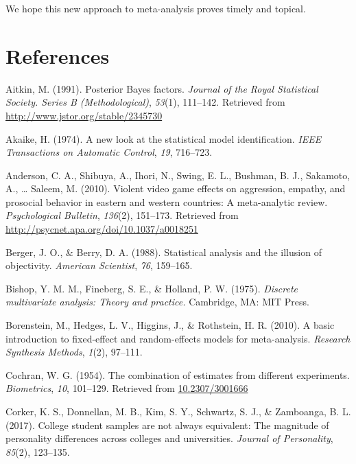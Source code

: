\documentclass[english,man]{apa6}
\theoremstyle{definition}
\theoremstyle{definition}
\theoremstyle{remark}
\begin{document}
We hope this new approach to meta-analysis proves timely and topical.

\newpage

\section*{References}\label{references}

\hypertarget{refs}{}
\hypertarget{ref-Aitkin:1991}{}
Aitkin, M. (1991). Posterior Bayes factors. \emph{Journal of the Royal
Statistical Society. Series B (Methodological)}, \emph{53}(1), 111--142.
Retrieved from \url{http://www.jstor.org/stable/2345730}

\hypertarget{ref-Akaike:1974}{}
Akaike, H. (1974). A new look at the statistical model identification.
\emph{IEEE Transactions on Automatic Control}, \emph{19}, 716--723.

\hypertarget{ref-Anderson:etal:2010}{}
Anderson, C. A., Shibuya, A., Ihori, N., Swing, E. L., Bushman, B. J.,
Sakamoto, A., \ldots{} Saleem, M. (2010). Violent video game effects on
aggression, empathy, and prosocial behavior in eastern and western
countries: A meta-analytic review. \emph{Psychological Bulletin},
\emph{136}(2), 151--173. Retrieved from
\url{http://psycnet.apa.org/doi/10.1037/a0018251}

\hypertarget{ref-Berger:Berry:1988}{}
Berger, J. O., \& Berry, D. A. (1988). Statistical analysis and the
illusion of objectivity. \emph{American Scientist}, \emph{76}, 159--165.

\hypertarget{ref-Bishop:etal:1975}{}
Bishop, Y. M. M., Fineberg, S. E., \& Holland, P. W. (1975).
\emph{Discrete multivariate analysis: Theory and practice.} Cambridge,
MA: MIT Press.

\hypertarget{ref-Borenstein:etal:2010}{}
Borenstein, M., Hedges, L. V., Higgins, J., \& Rothstein, H. R. (2010).
A basic introduction to fixed-effect and random-effects models for
meta-analysis. \emph{Research Synthesis Methods}, \emph{1}(2), 97--111.

\hypertarget{ref-Cochran:1954}{}
Cochran, W. G. (1954). The combination of estimates from different
experiments. \emph{Biometrics}, \emph{10}, 101--129. Retrieved from
\url{10.2307/3001666}

\hypertarget{ref-Corker:etal:2017}{}
Corker, K. S., Donnellan, M. B., Kim, S. Y., Schwartz, S. J., \&
Zamboanga, B. L. (2017). College student samples are not always
equivalent: The magnitude of personality differences across colleges and
universities. \emph{Journal of Personality}, \emph{85}(2), 123--135.
\end{document}
